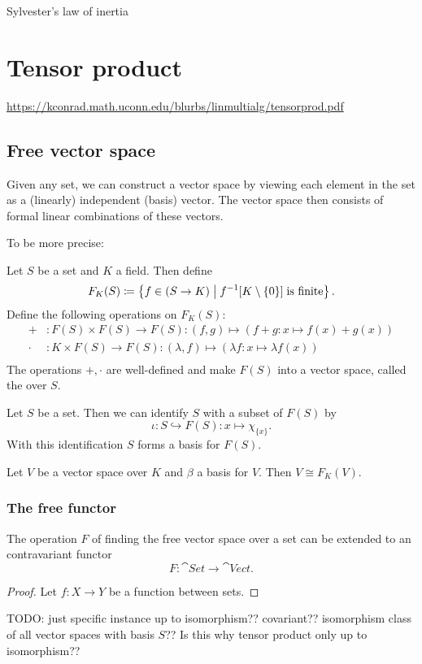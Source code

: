 Sylvester's law of inertia


\section{Tensor product}
\url{https://kconrad.math.uconn.edu/blurbs/linmultialg/tensorprod.pdf}
\subsection{Free vector space}
Given any set, we can construct a vector space by viewing each element in the set as a (linearly) independent (basis) vector. The vector space then consists of formal linear combinations of these vectors.

To be more precise:
\begin{definition}
Let $S$ be a set and $K$ a field. Then define
\[ F_K(S) \coloneqq \left\{ f\in(S\to K) \;\middle|\; f^{-1}[K\setminus\{0\}]\;\text{is finite} \right\}. \]
Define the following operations on $F_K(S)$:
\begin{align*}
+ &: F(S)\times F(S) \to F(S): (f,g)\mapsto (f+g: x\mapsto f(x)+g(x)) \\
\cdot &: K\times F(S) \to F(S): (\lambda,f)\mapsto (\lambda f: x\mapsto \lambda f(x)) \\
\end{align*}
The operations $+,\cdot$ are well-defined and make $F(S)$ into a vector space, called the  over $S$.
\end{definition}

\begin{proposition}
Let $S$ be a set. Then we can identify $S$ with a subset of $F(S)$ by
\[ \iota: S\hookrightarrow F(S): x\mapsto \chi_{\{x\}}. \]
With this identification $S$ forms a basis for $F(S)$.
\end{proposition}

\begin{lemma}
Let $V$ be a vector space over $K$ and $\beta$ a basis for $V$. Then $V\cong  F_K(V)$.
\end{lemma}

\subsubsection{The free functor}
\begin{proposition}
The operation $F$ of finding the free vector space over a set can be extended to an contravariant functor
\[ F: \cat{Set} \to \cat{Vect}. \]
\end{proposition}
\begin{proof}
Let $f:X\to Y$ be a function between sets.
\end{proof}
TODO: just specific instance up to isomorphism?? covariant?? isomorphism class of all vector spaces with basis $S$?? Is this why tensor product only up to isomorphism??

